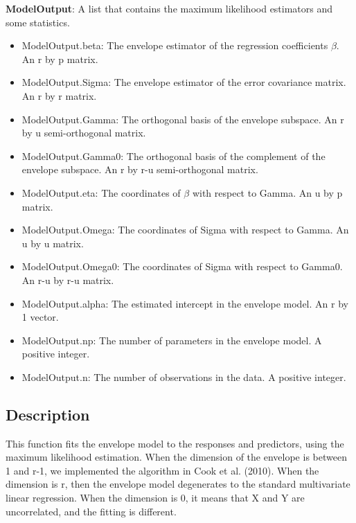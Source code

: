 \documentclass[a4paper,11pt,openany]{memoir}
\begin{document}
\begin{par}
\textbf{ModelOutput}: A list that contains the maximum likelihood estimators and some statistics.
\end{par} \vspace{1em}
\begin{itemize}
\setlength{\itemsep}{-1ex}
   \item ModelOutput.beta: The envelope estimator of the regression coefficients $\beta$. An r by p matrix.
   \item ModelOutput.Sigma: The envelope estimator of the error covariance matrix.  An r by r matrix.
   \item ModelOutput.Gamma: The orthogonal basis of the envelope subspace. An r by u semi-orthogonal matrix.
   \item ModelOutput.Gamma0: The orthogonal basis of the complement of the envelope subspace.  An r by r-u semi-orthogonal matrix.
   \item ModelOutput.eta: The coordinates of $\beta$ with respect to Gamma. An u by p matrix.
   \item ModelOutput.Omega: The coordinates of Sigma with respect to Gamma. An u by u matrix.
   \item ModelOutput.Omega0: The coordinates of Sigma with respect to Gamma0. An r-u by r-u matrix.
   \item ModelOutput.alpha: The estimated intercept in the envelope model.  An r by 1 vector.
   \item ModelOutput.np: The number of parameters in the envelope model.  A positive integer.
   \item ModelOutput.n: The number of observations in the data.  A positive integer.
\end{itemize}


\subsection*{Description}

\begin{par}
This function fits the envelope model to the responses and predictors, using the maximum likelihood estimation.  When the dimension of the envelope is between 1 and r-1, we implemented the algorithm in Cook et al. (2010).  When the dimension is r, then the envelope model degenerates to the standard multivariate linear regression.  When the dimension is 0, it means that X and Y are uncorrelated, and the fitting is different.
\end{par} \vspace{1em}
\end{document}

